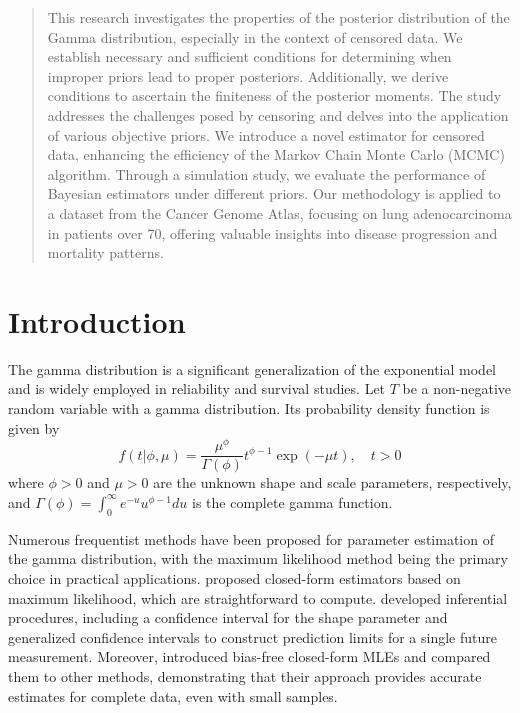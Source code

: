 \date{Received: date / Revised: date}


\maketitle

\begin{abstract}
This research investigates the properties of the posterior distribution of the Gamma distribution, especially in the context of censored data. We establish necessary and sufficient conditions for determining when improper priors lead to proper posteriors. Additionally, we derive conditions to ascertain the finiteness of the posterior moments. The study addresses the challenges posed by censoring and delves into the application of various objective priors. We introduce a novel estimator for censored data, enhancing the efficiency of the Markov Chain Monte Carlo (MCMC) algorithm. Through a simulation study, we evaluate the performance of Bayesian estimators under different priors. Our methodology is applied to a dataset from the Cancer Genome Atlas, focusing on lung adenocarcinoma in patients over 70, offering valuable insights into disease progression and mortality patterns.
\end{abstract}

\section{Introduction}



The gamma distribution is a significant generalization of the exponential model and is widely employed in reliability and survival studies. Let $T$ be a non-negative random variable with a gamma distribution. Its probability density function is given by
\begin{equation*}%
f(t|\phi,\mu)= \frac{\mu^\phi}{\Gamma(\phi)}t^{\phi-1}\exp(-\mu t) ,\quad t>0
\end{equation*}
where $\phi>0$ and $\mu>0$ are the unknown shape and scale parameters, respectively, and $\Gamma(\phi)=\int_{0}^{\infty}{e^{-u}u^{\phi-1}du}$ is the complete gamma function. 

Numerous frequentist methods have been proposed for parameter estimation of the gamma distribution, with the maximum likelihood method being the primary choice in practical applications. \cite{ye2017closed} proposed closed-form estimators based on maximum likelihood, which are straightforward to compute.  \cite{wang2018inference} developed inferential procedures, including a confidence interval for the shape parameter and generalized confidence intervals to construct prediction limits for a single future measurement. Moreover,  \cite{louzada2019note} introduced bias-free closed-form MLEs and compared them to other methods, demonstrating that their approach provides accurate estimates for complete data, even with small samples.

